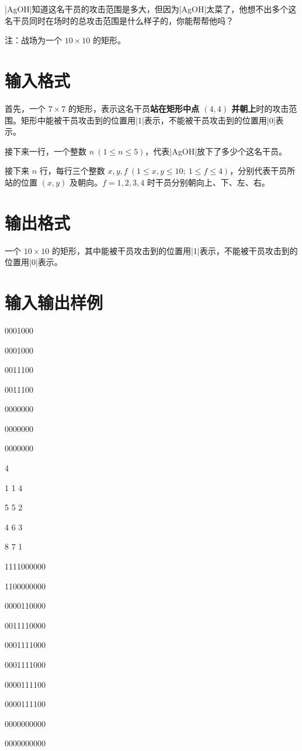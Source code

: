 \documentclass{ctpro}
\begin{document}
|AgOH|知道这名干员的攻击范围是多大，但因为|AgOH|太菜了，他想不出多个这名干员同时在场时的总攻击范围是什么样子的，你能帮帮他吗？

注：战场为一个 $10 \times 10$ 的矩形。

\section*{输入格式}
首先，一个 $7 \times 7$ 的矩形，表示这名干员\textbf{站在矩形中点 $(4,4)$ 并朝上}时的攻击范围。矩形中能被干员攻击到的位置用|1|表示，不能被干员攻击到的位置用|0|表示。

接下来一行，一个整数 $n~(1 \leq n \leq 5)$，代表|AgOH|放下了多少个这名干员。

接下来 $n$ 行，每行三个整数 $x,y,f~(1 \leq x,y \leq 10;~1 \leq f \leq 4)$，分别代表干员所站的位置 $(x,y)$ 及朝向。$f=1,2,3,4$ 时干员分别朝向上、下、左、右。

\section*{输出格式}
一个 $10 \times 10$ 的矩形，其中能被干员攻击到的位置用|1|表示，不能被干员攻击到的位置用|0|表示。

\section*{输入输出样例}
\testcasetab
{
	0001000\par
	0001000\par
	0011100\par
	0011100\par
	0000000\par
	0000000\par
	0000000\par
	4\par
	1 1 4\par
	5 5 2\par
	4 6 3\par
	8 7 1
}
{
	1111000000\par
	1100000000\par
	0000110000\par
	0011110000\par
	0001111000\par
	0001111000\par
	0000111100\par
	0000111100\par
	0000000000\par
	0000000000
}
\end{document}

